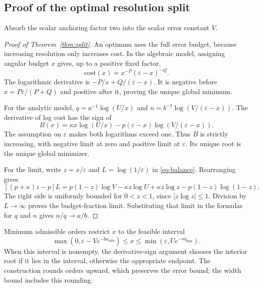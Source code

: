 \documentclass[11pt,letterpaper]{article}
\newcommand{\eps}{\varepsilon}
\theoremstyle{definition}
\theoremstyle{remark}
\begin{document}
\subsection{Proof of the optimal resolution split}
Absorb the scalar anchoring factor two into the scalar error constant \(V\).


\begin{proof}[Proof of Theorem~\ref{thm:split}]
An optimum uses the full error budget, because increasing resolution only
increases cost. In the algebraic model, assigning angular budget \(x\)
gives, up to a positive fixed factor,
\[
 \text{cost}(x)=x^{-P}(\eps-x)^{-Q}.
\]
The logarithmic derivative is \(-P/x+Q/(\eps-x)\).
It is negative before \(x=P\eps/(P+Q)\) and positive after it, proving the
unique global minimum.

For the analytic model,
\(q=a^{-1}\log(U/x)\) and \(n=b^{-1}\log(V/(\eps-x))\).
The derivative of log cost has the sign of
\[
 B(x)=\kappa x\log(U/x)-p(\eps-x)\log(V/(\eps-x)).
\]
The assumption on \(\eps\) makes both logarithms exceed one.
Thus \(B\) is strictly increasing, with negative limit at zero and positive
limit at \(\eps\). Its unique root is the unique global minimizer.

For the limit, write \(z=x/\eps\) and \(L=\log(1/\eps)\) in
\eqref{eq:balance}. Rearranging gives
\[
 [(p+\kappa)z-p]L
 =p(1-z)\log V-\kappa z\log U
       +\kappa z\log z-p(1-z)\log(1-z).
\]
The right side is uniformly bounded for \(0<z<1\), since
\(|z\log z|\le1\). Division by \(L\to\infty\) proves the budget-fraction
limit. Substituting that limit in the formulas for \(q\) and \(n\) gives
\(n/q\to a/b\).
\end{proof}
Minimum admissible orders restrict \(x\) to the feasible interval
\[
 \max(0,\eps-Ve^{-bn_{\min}})
 \le x\le\min(\eps,Ue^{-aq_{\min}}).
\]
When this interval is nonempty, the derivative-sign argument chooses the
interior root if it lies in the interval, otherwise the appropriate endpoint.
The construction rounds orders upward, which preserves the error bound;
the width bound includes this rounding.
\end{document}
